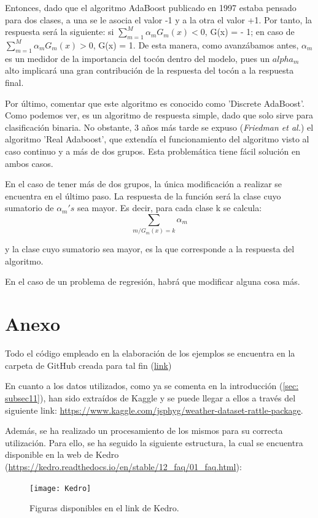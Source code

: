 \documentclass[12pt,twoside]{article}
\begin{document}
Entonces, dado que el algoritmo AdaBoost publicado en 1997 estaba pensado para dos clases, a una se le asocia el valor -1 y a la otra el valor +1. Por tanto, la respuesta será la siguiente: si $\sum_{m=1}^M \alpha_m G_m(x) < 0$, G(x) = - 1; en caso de $\sum_{m=1}^M \alpha_m G_m(x) > 0$, G(x) = 1. De esta manera, como avanzábamos antes, $\alpha_m$ es un medidor de la importancia del tocón dentro del modelo, pues un $alpha_m$ alto implicará una gran contribución de la respuesta del tocón a la respuesta final.

Por último, comentar que este algoritmo es conocido como 'Discrete AdaBoost'. Como podemos ver, es un algoritmo de respuesta simple, dado que solo sirve para clasificación binaria. No obstante, 3 años más tarde se expuso (\textit{Friedman et al.}) el algoritmo 'Real Adaboost', que extendía el funcionamiento del algoritmo visto al caso continuo y a más de dos grupos. Esta problemática tiene fácil solución en ambos casos.

En el caso de tener más de dos grupos, la única modificación a realizar se encuentra en el último paso. La respuesta de la función será la clase cuyo sumatorio de $\alpha_m's$ sea mayor. Es decir, para cada clase k se calcula:
\begin{equation*}
\sum_{m / G_m(x) = k} \alpha_m
\end{equation*}

\noindent
y la clase cuyo sumatorio sea mayor, es la que corresponde a la respuesta del algoritmo.

En el caso de un problema de regresión, habrá que modificar alguna cosa más. %




\newpage
\section{Anexo} \label{sec:Anexo}
Todo el código empleado en la elaboración de los ejemplos se encuentra en la carpeta de GitHub creada para tal fin (\url{link})

En cuanto a los datos utilizados, como ya se comenta en la introducción (\ref{sec: subsec11}), han sido extraídos de Kaggle y se puede llegar a ellos a través del siguiente link: \url{https://www.kaggle.com/jsphyg/weather-dataset-rattle-package}.

Además, se ha realizado un procesamiento de los mismos para su correcta utilización. Para ello, se ha seguido la siguiente estructura, la cual se encuentra disponible en la web de Kedro (\url{https://kedro.readthedocs.io/en/stable/12_faq/01_faq.html}):
\begin{figure}[h]
\centering
\texttt{[image: Kedro]}
\caption{Figuras disponibles en el link de Kedro.}
\end{figure}
\end{document}
